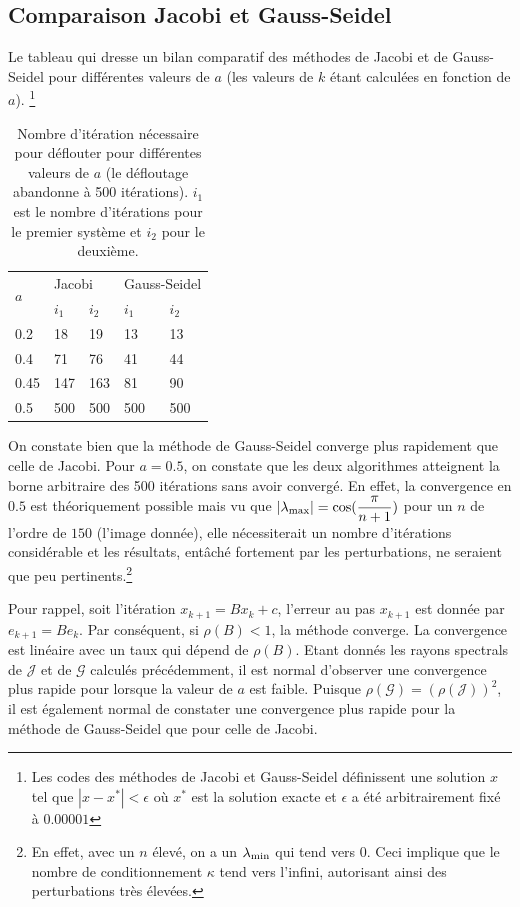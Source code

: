 \subsection{Comparaison Jacobi et Gauss-Seidel}
Le tableau qui dresse un bilan comparatif des méthodes de Jacobi et de Gauss-Seidel pour différentes valeurs de $a$ (les valeurs de $k$ étant calculées en fonction de $a$).
\footnote{Les codes des méthodes de Jacobi et Gauss-Seidel définissent une solution $x$
tel que $|x-x^*|<\epsilon$ où $x^*$ est la solution exacte et $\epsilon$ a été arbitrairement fixé à $0.00001$}
\begin{table}
  \centering
  \begin{tabular}{|l|l|l|l|l|}
    \hline
    \multirow{2}{*}{$a$} & \multicolumn{2}{l|}{Jacobi} & \multicolumn{2}{l|}{Gauss-Seidel}\\
    \cline{2-5}
        & $i_1$ & $i_2$ & $i_1$ & $i_2$\\
    \hline
    0.2 & 18    & 19    & 13    & 13\\
    \hline
    0.4 & 71    & 76    & 41    & 44\\
    \hline
    0.45& 147   & 163   & 81    & 90\\
    \hline
    0.5 & 500   & 500   & 500   & 500\\
    \hline
  \end{tabular}
  \caption{Nombre d'itération nécessaire pour déflouter pour différentes valeurs de $a$ (le défloutage abandonne à 500 itérations).
  $i_1$ est le nombre d'itérations pour le premier système et $i_2$ pour le deuxième.}
  \label{tab:iter}
\end{table}
On constate bien que la méthode de Gauss-Seidel converge plus rapidement que celle de Jacobi. Pour $a=0.5$, on constate que les deux algorithmes atteignent la borne arbitraire des 500 itérations sans avoir convergé. En effet, la convergence en $0.5$ est théoriquement possible mais vu que $|\lambda_\mathrm{max}| = \cos(\dfrac{\pi}{n+1})$ pour un $n$ de l'ordre de $150$ (l'image donnée), elle nécessiterait un nombre d'itérations considérable et les résultats, entâché fortement par les perturbations, ne seraient que peu pertinents.\footnote{En effet, avec un $n$ élevé, on a un $\lambda_\mathrm{min}$ qui tend vers $0$. Ceci implique que le nombre de conditionnement $\kappa$ tend vers l'infini, autorisant ainsi des perturbations très élevées.} %

Pour rappel, soit l'itération $x_{k+1} = B x_k + c$,
l'erreur au pas $x_{k+1}$ est donnée par $e_{k+1} = B e_k $. Par conséquent, si $\rho (B)<1$, la méthode converge. La convergence est linéaire avec un taux qui dépend de $\rho(B)$. Etant donnés les rayons spectrals de $\mathcal{J}$ et de $\mathcal{G}$ calculés précédemment, il est normal d'observer une convergence plus rapide pour lorsque la valeur de $a$ est faible. Puisque $\rho (\mathcal{G}) = (\rho (\mathcal{J}))^2$, il est également normal de constater une convergence plus rapide pour la méthode de Gauss-Seidel que pour celle de Jacobi. 



